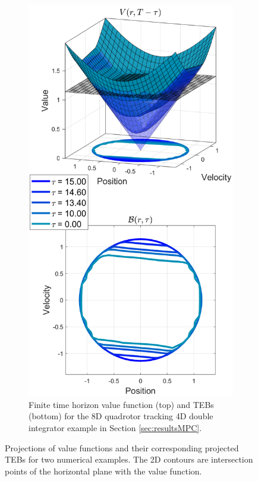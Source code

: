 \begin{figure}
\begin{subfigure}[b]{0.48\columnwidth}
  \label{fig:vf_TEB:5D3D}
  \end{subfigure}
  ~
  \begin{subfigure}[b]{0.48\columnwidth}
  \includegraphics[width=\columnwidth]{fig/tv_valfunc}
  \caption{\scriptsize Finite time horizon value function (top) and TEBs (bottom) for the 8D quadrotor tracking 4D double integrator example in Section \ref{sec:resultsMPC}.}  
  \label{fig:vf_TEB:8D4D}
  \end{subfigure}
	\caption{Projections of value functions and their corresponding projected TEBs for two numerical examples. The 2D contours are intersection points of the horizontal plane with the value function.}
	\label{fig:vf_TEB}
\end{figure} 

